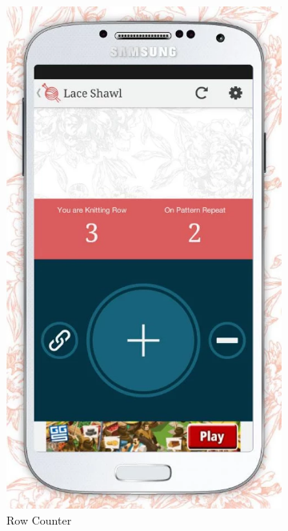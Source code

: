 \begin{figure}[H]
  \centering
    \begin{subfigure}[b]{0.33\textwidth}
      \centering
        \includegraphics[width=0.95\linewidth]{images/image10.png}
        \caption[Row Counter ]{Row Counter}
      \label{fig:knit_tink_row_counter}
    \end{subfigure}
    \begin{subfigure}[b]{0.33\textwidth}

\end{subfigure}
\end{figure}
